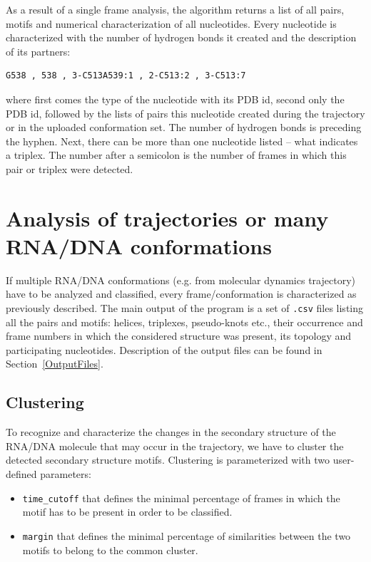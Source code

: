 \documentclass[12pt]{article}
\begin{document}
As a result of a single frame analysis, the algorithm returns a list of all pairs, motifs and numerical characterization of all nucleotides. Every nucleotide is characterized with the number of hydrogen bonds it created and the description of its partners:

\begin{verbatim}
G538 , 538 , 3-C513A539:1 , 2-C513:2 , 3-C513:7
\end{verbatim}

where first comes the type of the nucleotide with its PDB id, second only the PDB id, followed by the lists of pairs this nucleotide created during the trajectory or in the uploaded conformation set. The number of hydrogen bonds is preceding the hyphen. Next, there can be more than one nucleotide listed -- what indicates a triplex. The number after a semicolon is the number of frames in which this pair or triplex were detected.

\newpage
\section{Analysis of trajectories or many RNA/DNA conformations}
If multiple RNA/DNA conformations (e.g. from molecular dynamics trajectory) have to be analyzed and classified, every frame/conformation is characterized as previously described. The main output of the program is a set of \texttt{.csv} files listing all the pairs and motifs: helices, triplexes, pseudo-knots etc., their occurrence and frame numbers in which the considered structure was present, its topology and participating nucleotides. Description of the output files can be found in Section~\ref{OutputFiles}.

\subsection{Clustering}
To recognize and characterize the changes in the secondary structure of the RNA/DNA molecule that may occur in the trajectory, we have to cluster the detected secondary structure motifs. Clustering is parameterized with two user-defined parameters: \\
\begin{itemize}
\item \texttt{time\_cutoff} that defines the minimal percentage of frames in which the motif has to be present in order to be classified.
\item \texttt{margin} that defines the minimal percentage of similarities between the two motifs to belong to the common cluster. 
\end{itemize}
\end{document}
